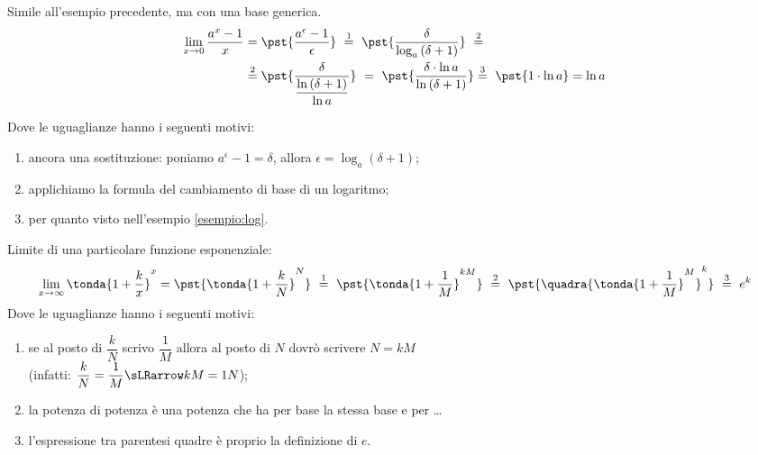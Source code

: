 \begin{esempio}
Simile all'esempio precedente, ma con una base generica.
\begin{align*}
\lim_{x \rightarrow 0} \dfrac{a^x-1}{x} &=
\pst{\dfrac{a^\epsilon-1}{\epsilon}}
~ \stackrel{1}{=} ~  
\pst{\dfrac{\delta}{\log_a{(\delta+1)}}}~ \stackrel{2}{=}\\
&\stackrel{2}{=} 
\pst{\frac{\delta}{\dfrac{\ln{(\delta+1)}}{\ln a}}} ~=~
\pst{\frac{\delta \cdot \ln a}{\ln{(\delta+1)}}} %
\stackrel{3}{=} ~ 
\pst{1 \cdot \ln a}=\ln{a}
\end{align*}

Dove le uguaglianze hanno i seguenti motivi:
\begin{enumerate} [nosep]
 \item ancora una sostituzione: poniamo
\(a^\epsilon-1=\delta\), allora \(\epsilon=\log_a(\delta+1)\);
 \item applichiamo la formula del cambiamento di base di un logaritmo; 
 \item per quanto visto nell'esempio \ref{esempio:log}.
\end{enumerate}
\end{esempio}

\begin{esempio}
Limite di una particolare funzione esponenziale:
\begin{align*}
 \lim_{x \rightarrow \infty} \tonda{1+\dfrac{k}{x}}^x =
 \pst{\tonda{1+\dfrac{k}{N}}^N}
~ \stackrel{1}{=} ~  
\pst{\tonda{1+\dfrac{1}{M}}^{kM}}
~ \stackrel{2}{=} ~
\pst{\quadra{\tonda{1+\dfrac{1}{M}}^M}^k}
~ \stackrel{3}{=} ~ e^k
\end{align*}
Dove le uguaglianze hanno i seguenti motivi:
\begin{enumerate} [nosep]
 \item se al posto di \(\dfrac{k}{N}\) scrivo \(\dfrac{1}{M}\) 
allora al posto di \(N\) dovrò scrivere \(N=kM\)\\ 
(infatti: \(\dfrac{k}{N}=\dfrac{1}{M} \sLRarrow kM=1N\));
 \item la potenza di potenza è una potenza che ha per base la stessa base 
e per \dots
 \item l'espressione tra parentesi quadre è proprio la definizione di \(e\).
\end{enumerate}
\end{esempio}

